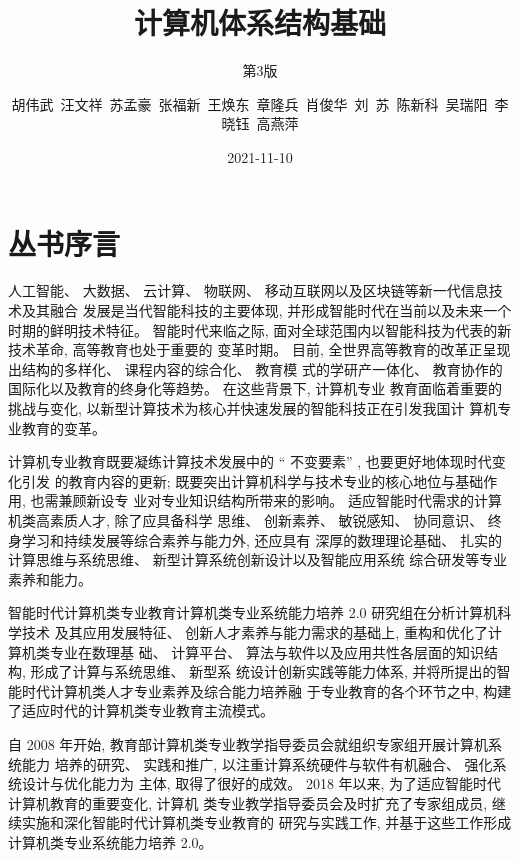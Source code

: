 \documentclass[]{ctexbook}
\title{计算机体系结构基础}
\subtitle{第3版}
\author{胡伟武~汪文祥~苏孟豪~张福新~王焕东~章隆兵~肖俊华~刘~苏~陈新科~吴瑞阳~李晓钰~高燕萍}
\date{2021-11-10}
\begin{document}
\maketitle


\thispagestyle{empty}

\setlength{\abovedisplayskip}{-5pt}
\setlength{\abovedisplayshortskip}{-5pt}

{
\setcounter{tocdepth}{2}
\tableofcontents
}
\listoftables
\listoffigures
\newpage{}

\hypertarget{ux4e1bux4e66ux5e8fux8a00}{%
\chapter*{丛书序言}\label{ux4e1bux4e66ux5e8fux8a00}}



人工智能、 大数据、 云计算、 物联网、 移动互联网以及区块链等新一代信息技术及其融合
发展是当代智能科技的主要体现, 并形成智能时代在当前以及未来一个时期的鲜明技术特征。
智能时代来临之际, 面对全球范围内以智能科技为代表的新技术革命, 高等教育也处于重要的
变革时期。 目前, 全世界高等教育的改革正呈现出结构的多样化、 课程内容的综合化、 教育模
式的学研产一体化、 教育协作的国际化以及教育的终身化等趋势。 在这些背景下, 计算机专业
教育面临着重要的挑战与变化, 以新型计算技术为核心并快速发展的智能科技正在引发我国计
算机专业教育的变革。

计算机专业教育既要凝练计算技术发展中的 `` 不变要素'' , 也要更好地体现时代变化引发
的教育内容的更新; 既要突出计算机科学与技术专业的核心地位与基础作用, 也需兼顾新设专
业对专业知识结构所带来的影响。 适应智能时代需求的计算机类高素质人才, 除了应具备科学
思维、 创新素养、 敏锐感知、 协同意识、 终身学习和持续发展等综合素养与能力外, 还应具有
深厚的数理理论基础、 扎实的计算思维与系统思维、 新型计算系统创新设计以及智能应用系统
综合研发等专业素养和能力。

智能时代计算机类专业教育计算机类专业系统能力培养 2.0 研究组在分析计算机科学技术
及其应用发展特征、 创新人才素养与能力需求的基础上, 重构和优化了计算机类专业在数理基
础、 计算平台、 算法与软件以及应用共性各层面的知识结构, 形成了计算与系统思维、 新型系
统设计创新实践等能力体系, 并将所提出的智能时代计算机类人才专业素养及综合能力培养融
于专业教育的各个环节之中, 构建了适应时代的计算机类专业教育主流模式。

自 2008 年开始, 教育部计算机类专业教学指导委员会就组织专家组开展计算机系统能力
培养的研究、 实践和推广, 以注重计算系统硬件与软件有机融合、 强化系统设计与优化能力为
主体, 取得了很好的成效。 2018 年以来, 为了适应智能时代计算机教育的重要变化, 计算机
类专业教学指导委员会及时扩充了专家组成员, 继续实施和深化智能时代计算机类专业教育的
研究与实践工作, 并基于这些工作形成计算机类专业系统能力培养 2.0。
\end{document}
